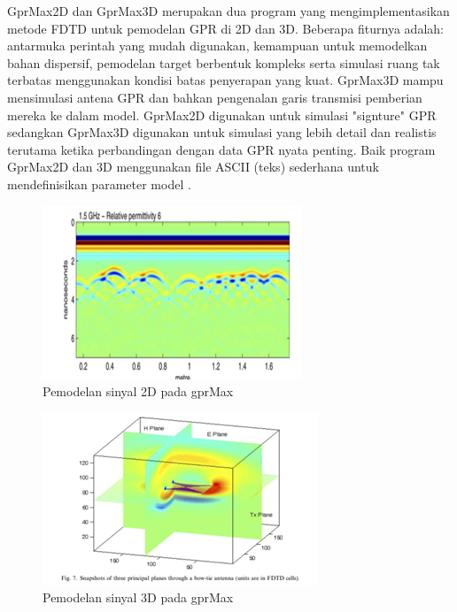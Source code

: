 GprMax2D dan GprMax3D merupakan dua program yang mengimplementasikan metode FDTD untuk pemodelan GPR di 2D dan 3D. Beberapa fiturnya adalah: antarmuka perintah yang mudah digunakan, kemampuan untuk memodelkan bahan dispersif, pemodelan target berbentuk kompleks serta simulasi ruang tak terbatas menggunakan kondisi batas penyerapan yang kuat. GprMax3D mampu mensimulasi antena GPR dan bahkan pengenalan garis transmisi pemberian mereka ke dalam model. GprMax2D digunakan untuk simulasi "signture" GPR sedangkan GprMax3D digunakan untuk simulasi yang lebih detail dan realistis terutama ketika perbandingan dengan data GPR nyata penting. Baik program GprMax2D dan 3D menggunakan file ASCII (teks) sederhana untuk mendefinisikan parameter model \parencite{Giannopoulos2005}.
\begin{figure} [H] \centering
  \includegraphics[scale=1]{gambar/bab2/gprmax2.png}
  \caption{Pemodelan sinyal 2D pada gprMax \parencite{Giannopoulos2005}}
  \label{fig:grMax2d}
\end{figure}
\begin{figure} [H] \centering
  \includegraphics[scale=1]{gambar/bab2/gprmax3.png}
  \caption{Pemodelan sinyal 3D pada gprMax  \parencite{Giannopoulos2005}}
  \label{fig:grMax3d}
\end{figure}

